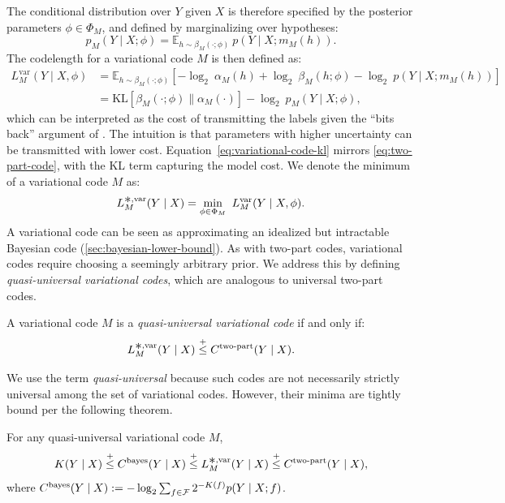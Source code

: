 The conditional distribution over $Y$ given $X$ is therefore specified by the posterior parameters $\phi \in \Phi_M$, and defined by marginalizing over hypotheses:
\begin{equation}
p_M(Y \mid X; \phi) = \mathbb{E}_{h \sim  \beta_M(\cdot;\phi)} ~p(Y \mid X;m_M(h)).
\end{equation}
The codelength for a variational code $M$ is then defined as:
\begin{align}
L_M^{\text{var}}(Y \mid X,\phi) &= \mathbb{E}_{h \sim \beta_M(\cdot;\phi)} \left[
-\log_2~\alpha_M(h) + \log_2~\beta_M(h;\phi) - \log_2~p(Y \mid X; m_M(h))
\right] \label{eq:variational-code} \\
 &= \text{KL}\left[ \beta_M(\cdot;\phi) \parallel \alpha_M(\cdot) \right] - \log_2~ p_M(Y \mid X; \phi), \label{eq:variational-code-kl} 
\end{align}
which can be interpreted as the cost of transmitting the labels given the ``bits back'' argument of \citet{hinton1993keeping}.
The intuition is that parameters with higher uncertainty can be transmitted with lower cost. Equation~\ref{eq:variational-code-kl} mirrors \eqref{eq:two-part-code}, with the KL term capturing the model cost.
We denote the minimum of a variational code $M$ as:
\begin{equation}
L_M^{\bigast,\text{var}}(Y \mid X) = \min_{\phi \in \Phi_M}~ L_M^{\text{var}}(Y \mid X,\phi).
\end{equation}
A variational code can be seen as approximating an idealized but intractable Bayesian code (\ref{sec:bayesian-lower-bound}). As with two-part codes, variational codes require choosing a seemingly arbitrary prior.
We address this by defining \emph{quasi-universal variational codes}, which are analogous to universal two-part codes.

\begin{defn}
A variational code $M$ is a \emph{quasi-universal variational code} if and only if:
\begin{equation}
L^{\bigast,\text{var}}_{M}(Y \mid X) \leqc C^{\text{two-part}}(Y \mid X).
\end{equation}
\end{defn}


We use the term \emph{quasi-universal} because such codes are not necessarily strictly universal among the set of variational codes. However, their minima are tightly bound per the following theorem.

\begin{prop}\label{thm:codelength-relations}
For any quasi-universal variational code $M$,
\begin{equation}
    K(Y \mid X) \leqc C^{\text{bayes}}(Y \mid X) \leqc L^{\bigast,\text{var}}_{M}(Y \mid X) \leqc C^{\text{two-part}}(Y \mid X),
\end{equation}
where $C^{\text{bayes}}(Y \mid X) := -\log_2 \sum_{f \in {\mathcal{F}}} 2^{-K(f)} p(Y \mid X;f)$.
\end{prop}

